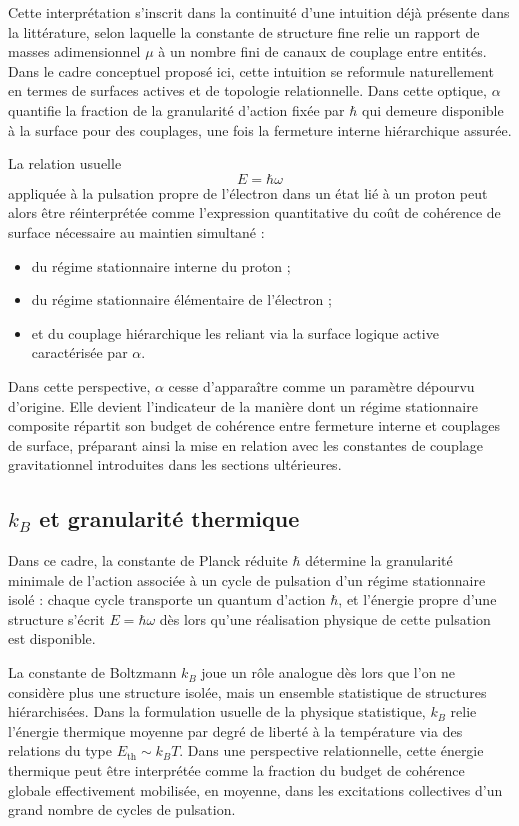 \documentclass[11pt,a4paper]{article}
\begin{document}
Cette interprétation s’inscrit dans la continuité d’une intuition déjà présente dans la littérature, selon laquelle la constante de structure fine relie un rapport de masses adimensionnel \(\mu\) à un nombre fini de canaux de couplage entre entités. Dans le cadre conceptuel proposé ici, cette intuition se reformule naturellement en termes de surfaces actives et de topologie relationnelle. Dans cette optique, \(\alpha\) quantifie la fraction de la granularité d’action fixée par \(\hbar\) qui demeure disponible à la surface pour des couplages, une fois la fermeture interne hiérarchique assurée.

La relation usuelle
\[
E = \hbar \omega
\]
appliquée à la pulsation propre de l’électron dans un état lié à un proton peut alors être réinterprétée comme l’expression quantitative du coût de cohérence de surface nécessaire au maintien simultané :
\begin{itemize}
  \item du régime stationnaire interne du proton ;
  \item du régime stationnaire élémentaire de l’électron ;
  \item et du couplage hiérarchique les reliant via la surface logique active caractérisée par \(\alpha\).
\end{itemize}

Dans cette perspective, \(\alpha\) cesse d’apparaître comme un paramètre dépourvu d’origine. Elle devient l’indicateur de la manière dont un régime stationnaire composite répartit son budget de cohérence entre fermeture interne et couplages de surface, préparant ainsi la mise en relation avec les constantes de couplage gravitationnel introduites dans les sections ultérieures.

\subsection{\texorpdfstring{\(k_B\)}{kB} et granularité thermique}

Dans ce cadre, la constante de Planck réduite \(\hbar\) détermine la granularité minimale de l’action associée à un cycle de pulsation d’un régime stationnaire isolé : chaque cycle transporte un quantum d’action \(\hbar\), et l’énergie propre d’une structure s’écrit \(E = \hbar \omega\) dès lors qu’une réalisation physique de cette pulsation est disponible. 

La constante de Boltzmann \(k_B\) joue un rôle analogue dès lors que l’on ne considère plus une structure isolée, mais un ensemble statistique de structures hiérarchisées. Dans la formulation usuelle de la physique statistique, \(k_B\) relie l’énergie thermique moyenne par degré de liberté à la température via des relations du type \(E_{\mathrm{th}} \sim k_B T\). Dans une perspective relationnelle, cette énergie thermique peut être interprétée comme la fraction du budget de cohérence globale effectivement mobilisée, en moyenne, dans les excitations collectives d’un grand nombre de cycles de pulsation.
\end{document}
